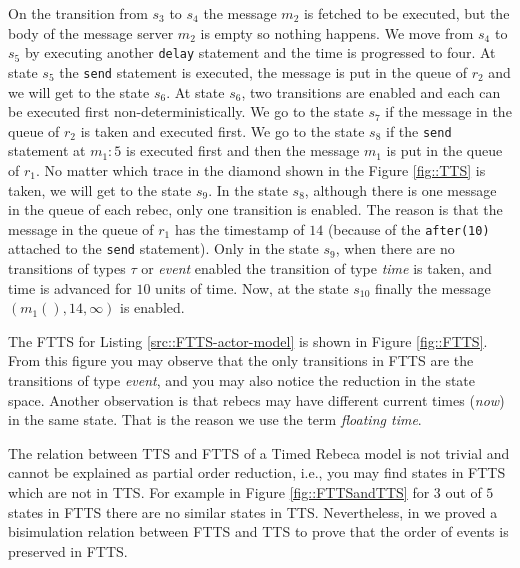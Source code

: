 On the transition from $s_3$ to $s_4$ the message $m_2$ is fetched to be executed, but the body of the message server $m_2$ is empty so nothing happens. We move from $s_4$ to $s_5$ by executing another \texttt{delay} statement and the time is progressed to four.
At state $s_5$ the \texttt{send} statement is executed, the message is put in the queue of $r_2$ and we will get to the state $s_6$.
At state $s_6$, two transitions are enabled and each can be  executed first non-deterministically. 
We go to the state $s_7$ if the message in the queue of $r_2$ is taken and executed first. We go to the state $s_8$ if the \texttt{send} statement at $m_1:5$  is executed first and then the message $m_1$ is put in the queue of $r_1$. No matter which trace in the diamond shown in the Figure \ref{fig::TTS} is taken, we will get to the state $s_9$.
In the state $s_8$, although there is one message in the queue of each rebec, only one transition is enabled. The reason is that   the message in the queue of $r_1$ has the timestamp of $14$ (because of the \texttt{after(10)} attached to the \texttt{send} statement).
Only in the state $s_9$, when there are no transitions of types $\tau$ or \textit{event}  enabled the transition of type \textit{time} is taken, and time is advanced for $10$ units of time. Now, at the state $s_{10}$ finally the message $(m_1(), 14,\infty )$ is enabled.

The FTTS for Listing \ref{src::FTTS-actor-model} is shown in Figure \ref{fig::FTTS}. From this figure you may observe that the only transitions in FTTS are the transitions of type \textit{event}, and you may also notice the reduction in the state space.
%
Another observation is that
rebecs may have different current times (\textit{now}) in the same state. That is the reason we use the term \textit{floating time}.


%
The relation between TTS and FTTS of a Timed Rebeca model is not trivial and cannot be explained as partial order reduction, i.e., you may find states in FTTS which are not in TTS.
For example in Figure \ref{fig::FTTSandTTS} for $3$ out of $5$ states in FTTS there are no similar states in TTS. Nevertheless, in \cite{DBLP:conf/facs2/KhamespanahSVK15} we proved a bisimulation relation between FTTS and TTS to prove that the order of events is preserved in FTTS.

